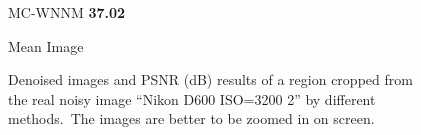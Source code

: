 \begin{figure}
{\begin{minipage}[t]{0.19\textwidth}
{\footnotesize MC-WNNM \textbf{37.02}}
\end{minipage}
\begin{minipage}[t]{0.19\textwidth}
\centering
{}
{\footnotesize Mean Image }
\end{minipage}
}
    \caption{Denoised images and PSNR (dB) results of a region cropped from the real noisy image ``Nikon D600 ISO=3200 2'' \cite{crosschannel2016} by different methods.\ The images are better to be zoomed in on screen.}
    \label{fig4-14}
\end{figure}


